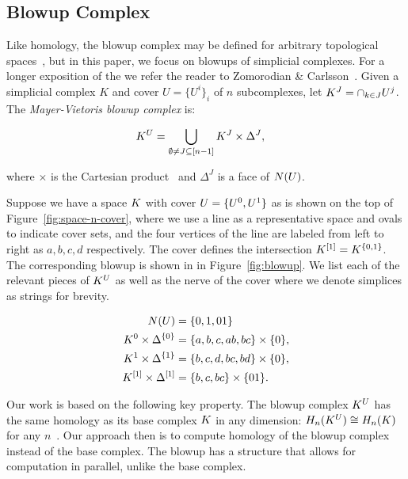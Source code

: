 \subsection{Blowup Complex}
Like homology, the blowup complex may be defined for arbitrary topological 
spaces~\cite{zc-lh-08}, but in this paper, we focus on blowups of simplicial 
complexes. For a longer exposition of the \mvb{} we refer the reader to Zomorodian
\& Carlsson~\cite{zc-lh-08}. Given a simplicial complex $K$ and cover 
$U = \{U^i\}_i$ of $n$ subcomplexes, let 
$K^J = \cap_{k \in J} U^j$. The \emph{Mayer-Vietoris blowup complex} is:

\begin{align*}
K^U &= \bigcup_{\emptyset \not = J \subseteq [n-1]} K^J \times \Delta^J,
\end{align*}

where $\times$ is the Cartesian product~\cite{zc-lh-08} and $\Delta^J$ is a face of $N(U)$.
\begin{example}
\label{ex:blowup}
Suppose we have a space $K$ with cover $U = \{ U^0, U^1 \}$ as is shown on 
the top of Figure~\ref{fig:space-n-cover}, where we use a line as a 
representative space and ovals to indicate cover sets, and the four vertices
of the line are labeled from left to right as $a, b, c, d$ respectively.
The cover defines the intersection $K^{[1]} = K^{ \{ 0 , 1 \} }$. 
The corresponding blowup is shown in in Figure~\ref{fig:blowup}. We list each of
the relevant pieces of $K^{U}$ as well as the nerve of the cover where we denote simplices as strings for 
brevity.  

\begin{align*}
N(U) &= \{ 0, 1, 01 \} \\
K^0 \times \Delta^{\{0\}} &= \{a,b,c,ab,bc\} \times \{0\}, \\
K^1 \times \Delta^{\{1\}} &= \{b,c,d,bc,bd\} \times \{0\}, \\
K^{[1]} \times \Delta^{[1]} &=\{b,c,bc\} \times \{01\}. 
\end{align*}

\end{example}

Our work is based on the following key property.
The blowup complex $K^U$ has the same homology as its base complex $K$ in any 
dimension: $H_n(K^U) \cong H_n(K)$ for any $n$~\cite[Lemma 1]{zc-lh-08}. 
Our approach then is to compute homology of the blowup complex 
instead of the base complex. The blowup has a structure that allows 
for computation in parallel, unlike the base complex.

